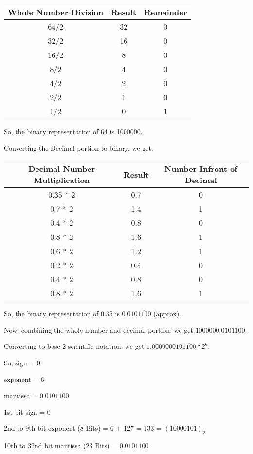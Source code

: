 \documentclass[11pt]{article}
\begin{document}
\begin{tabular}{|c|c|c|}
    \hline
    \textbf{Whole Number Division} & \textbf{Result} & \textbf{Remainder} \\
    \hline
    64/2 & 32 & 0 \\
    32/2 & 16 & 0 \\
    16/2 & 8 & 0 \\
    8/2 & 4 & 0 \\
    4/2 & 2 & 0 \\
    2/2 & 1 & 0 \\
    1/2 & 0 & 1 \\
    \hline
\end{tabular}

So, the binary representation of 64 is 1000000.

Converting the Decimal portion to binary, we get.

\begin{tabular}{|c|c|c|}
    \hline
    \textbf{Decimal Number Multiplication} & \textbf{Result} & \textbf{Number Infront of Decimal} \\
    \hline
    0.35 * 2 & 0.7 & 0 \\
    0.7 * 2 & 1.4 & 1 \\
    0.4 * 2 & 0.8 & 0 \\
    0.8 * 2 & 1.6 & 1 \\
    0.6 * 2 & 1.2 & 1 \\
    0.2 * 2 & 0.4 & 0 \\
    0.4 * 2 & 0.8 & 0 \\
    0.8 * 2 & 1.6 & 1 \\
    \hline
\end{tabular}

So, the binary representation of 0.35 is $0.010\overline{1100}$ (approx).


Now, combining the whole number and decimal portion, we get $1000000.010\overline{1100}$.

Converting to base 2 scientific notation, we get $1.000000010\overline{1100} * 2^{6}$.

So, sign = 0

exponent = 6

mantissa = $0.010\overline{1100}$
\vspace*{12pt}

1st bit sign = 0

2nd to 9th bit exponent (8 Bits) = 6 + 127 = 133 = $(10000101)_2$

10th to 32nd bit mantissa (23 Bits) = $0.010\overline{1100}$
\end{document}
